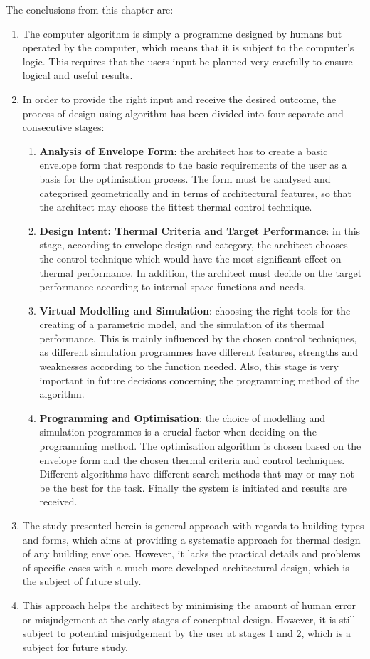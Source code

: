 The conclusions from this chapter are:
\begin{enumerate}
	\item The computer algorithm is simply a programme designed by humans but operated by the computer, which means that it is subject to the computer's logic. This requires that the users input be planned very carefully to ensure logical and useful results.
	\item In order to provide the right input and receive the desired outcome, the process of design using algorithm has been divided into four separate and consecutive stages:
		\begin{enumerate}
			\item \textbf{Analysis of Envelope Form}: the architect has to create a basic envelope form that responds to the basic requirements of the user as a basis for the optimisation process. The form must be analysed and categorised geometrically and in terms of architectural features, so that the architect may choose the fittest thermal control technique.
			\item \textbf{Design Intent: Thermal Criteria and Target Performance}: in this stage, according to envelope design and category, the architect chooses the control technique which would have the most significant effect on thermal performance. In addition, the architect must decide on the target performance according to internal space functions and needs.
			\item \textbf{Virtual Modelling and Simulation}: choosing the right tools for the creating of a parametric model, and the simulation of its thermal performance. This is mainly influenced by the chosen control techniques, as different simulation programmes have different features, strengths and weaknesses according to the function needed. Also, this stage is very important in future decisions concerning the programming method of the algorithm.
			\item \textbf{Programming and Optimisation}: the choice of modelling and simulation programmes is a crucial factor when deciding on the programming method. The optimisation algorithm is chosen based on the envelope form and the chosen thermal criteria and control techniques. Different algorithms have different search methods that may or may not be the best for the task. Finally the system is initiated and results are received.
		\end{enumerate}
	\item The study presented herein is general approach with regards to building types and forms, which aims at providing a systematic approach for thermal design of any building envelope. However, it lacks the practical details and problems of specific cases with a much more developed architectural design, which is the subject of future study.
	\item This approach helps the architect by minimising the amount of human error or misjudgement at the early stages of conceptual design. However, it is still subject to potential misjudgement by the user at stages 1 and 2, which is a subject for future study.
\end{enumerate}

